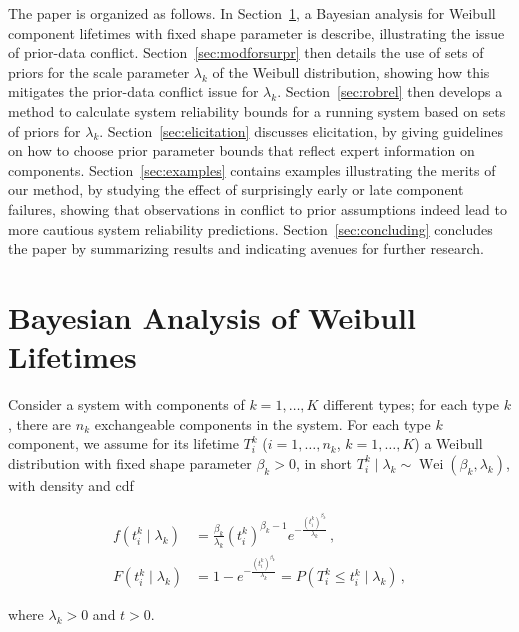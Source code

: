 \documentclass[Journal,SectionNumbers,InsideFigs]{ascelike}
\newcommand{\Rsys}{R_\text{sys}}
\def\Rsys{R_\text{sys}}
\newcommand{\wei}{\operatorname{Wei}} %
\def\tnow{t_\text{now}}
\begin{document}
The paper is organized as follows.
In Section~\ref{sec:weibull}, a Bayesian analysis for Weibull component lifetimes
with fixed shape parameter is describe,
illustrating the issue of prior-data conflict.
Section~\ref{sec:modforsurpr} then details the use of sets of priors
for the scale parameter $\lambda_k$ of the Weibull distribution,
showing how this mitigates the prior-data conflict issue for $\lambda_k$.
Section~\ref{sec:robrel} then develops a method to calculate system reliability bounds
for a running system based on sets of priors for $\lambda_k$. 
Section~\ref{sec:elicitation} discusses elicitation,
by giving guidelines on how to choose prior parameter bounds
that reflect expert information on components.
Section~\ref{sec:examples} contains examples illustrating the merits of our method,
by studying the effect of surprisingly early or late component failures,
showing that observations in conflict to prior assumptions
indeed lead to more cautious system reliability predictions.
Section~\ref{sec:concluding} concludes the paper by summarizing results
and indicating avenues for further research.

\section{Bayesian Analysis of Weibull Lifetimes}
\label{sec:weibull}

Consider a system with components of $k=1,\ldots,K$ different types;
for each type $k$, there are $n_k$ exchangeable components in the system.
For each type $k$ component, we assume for its lifetime $T_i^k$ ($i=1,\ldots,n_k$, $k = 1, \ldots, K$)
a Weibull distribution with fixed shape parameter $\beta_k > 0$,
in short $T_i^k \mid \lambda_k \sim \wei(\beta_k,\lambda_k)$,
with density and cdf%
\begin{linenomath*}
\begin{align}
\label{eq:weibulldens}
f(t_i^k \mid \lambda_k) &= \frac{\beta_k}{\lambda_k} (t_i^k)^{\beta_k-1} e^{-\frac{(t_i^k)^{\beta_k}}{\lambda_k}}\,, \\
\label{eq:weibullcdf}
F(t_i^k \mid \lambda_k) &= 1 - e^{-\frac{(t_i^k)^{\beta_k}}{\lambda_k}} = P(T_i^k \leq t_i^k \mid \lambda_k)\,,
\end{align}
\end{linenomath*}
where $\lambda_k > 0$ and $t > 0$.
\end{document}

